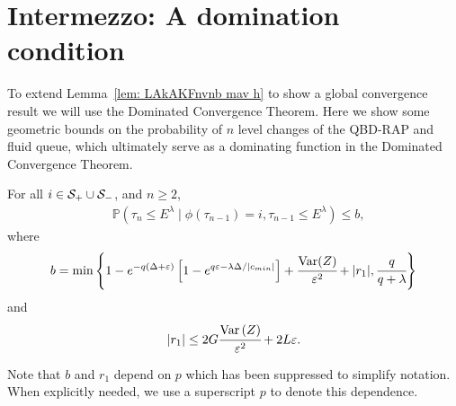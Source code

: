 \section{Intermezzo: A domination condition}
To extend Lemma~\ref{lem: LAkAKFnvnb mav h} to show a global convergence result we will use the Dominated Convergence Theorem. Here we show some geometric bounds on the probability of \(n\) level changes of the QBD-RAP and fluid queue, which ultimately serve as a dominating function in the Dominated Convergence Theorem. 


\begin{lem}\label{lem: another bound}
	For all \(i\in\mathcal S_+\cup \mathcal{S}_-\), and \(n\geq 2\),
	\begin{align}
		&\mathbb P(\tau_n\leq E^\lambda \mid \phi(\tau_{n-1})=i, \tau_{n-1}\leq  E^\lambda ) \leq b,
	\end{align}
	where 
	\[b = \min\left\{1-e^{-q(\Delta+\varepsilon)}\left[1-e^{q\varepsilon-\lambda \Delta/|c_{min}|}\right] + \cfrac{\mathrm{Var}(Z)}{\varepsilon^2} + |r_1|,\cfrac{q}{q+\lambda}\right\}\]
	and  
	\[|r_1|\leq 2G\cfrac{\mathrm{Var} \left(Z\right)}{\varepsilon^2} + 2L\varepsilon.\]
\end{lem}
Note that \(b\) and \(r_1\) depend on \(p\) which has been suppressed to simplify notation. When explicitly needed, we use a superscript \(p\) to denote this dependence.  
